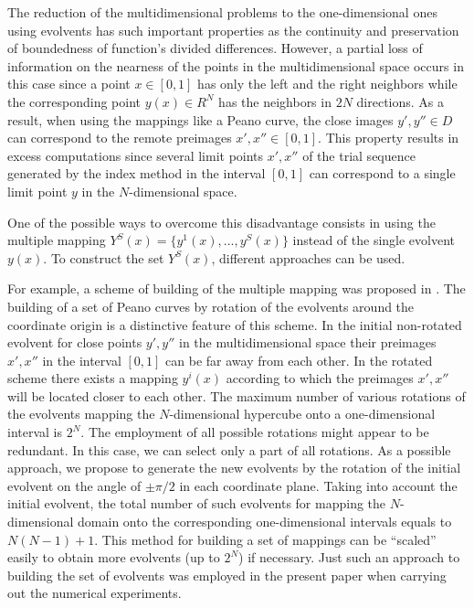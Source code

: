 \documentclass{llncs}
\begin{document}
The reduction of the multidimensional problems to the one-dimensional ones using evolvents 
has such important properties as the continuity and preservation of boundedness of function's 
divided differences. However, a partial loss of information on the nearness of the points in the 
multidimensional space occurs in this case since a point $x \in [0,1]$ has only the left and the 
right neighbors while the corresponding point $y(x) \in R^N$ has the neighbors in $2N$ 
directions. As a result, when using the mappings like a Peano curve, the close images $y', y'' \in 
D$ can correspond to the remote preimages $x', x'' \in [0,1]$. This property results in excess 
computations since several limit points $x', x''$ of the trial sequence generated by the index 
method in the interval $[0,1]$ can correspond to a single limit point $y$ in the $N$-dimensional 
space.

One of the possible ways to overcome this disadvantage consists in using the multiple mapping 
$Y^S(x)=\{ y^1 (x),...,y^S(x)\}$ instead of the single evolvent $y(x)$. To construct the set 
$Y^S(x)$, different approaches can be used. 

For example, a scheme of building of the multiple mapping was proposed in \cite{6_Gergel2009}. The building of a set of Peano curves by rotation of the evolvents 
around the coordinate origin is a distinctive feature of this scheme. In the initial non-rotated 
evolvent for close points $y', y''$ in the multidimensional space their preimages $x', x''$ in the 
interval $[0,1]$ can be far away from each other. In the rotated scheme there exists a mapping 
$y^i(x)$ according to which the preimages $x', x''$ will be located closer to each other. The 
maximum number of various rotations of the evolvents mapping the $N$-dimensional 
hypercube onto a one-dimensional interval is $2^N$. The employment of all possible rotations 
might appear to be redundant. In this case, we can select only a part of all rotations. As a 
possible approach, we propose to generate the new evolvents by the rotation of the initial 
evolvent on the angle of $\pm\pi/2$ in each coordinate plane. Taking into account the initial 
evolvent, the total number of such evolvents for mapping the $N$-dimensional domain onto the 
corresponding one-dimensional intervals equals to $N(N-1)+1$. This method for building a set 
of mappings can be ``scaled'' easily to obtain more evolvents (up to $2^N$) if necessary.
Just such an approach to building the set of evolvents was employed in the present paper when 
carrying out the numerical experiments. 
\end{document}
